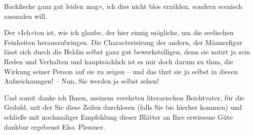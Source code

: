                Backfische ganz gut leiden mag«, ich dies nicht blos erzählen, sondern scenisch
               ausmalen will.\pend
           
\pstart
           Der »Ich«ton ist, wie ich glaube, der hier einzig mögliche, um die seelischen
               Feinheiten herauszubringen. Die Characterisirung der andern, der Männerfigur lässt
               sich durch die Heldin selbst ganz gut bewerkstelligen, denn sie notirt ja sein Reden
               und Verhalten und hauptsächlich ist es mir doch darum zu thun, die Wirkung {\pb}seiner Person auf sie zu zeigen – und das thut sie ja
               selbst in diesen Aufzeichnungen! – Nun, Sie werden ja selbst sehen!\pend
           
\pstart
           Und somit danke ich Ihnen, meinem verehrten literarischen Beichtvater, für die
               Geduld, mit der Sie diese Zeilen durchlesen (falls Sie bis hierher kommen) und
               schließe mit nochmaliger Empfehlung dieser Blätter an Ihre erwiesene Güte dankbar ergebenst\pend
           \pstart \spacefill\mbox{Elsa Plessner.}\pend{}\endnumbering{}  \newcommand{\dateiname}{L03700}\newcommand{\titel}{Elsa Plessner an Arthur Schnitzler, 14. 4. 1896}\newcommand{\editorInnen}{Selma Jahnke und Martin Anton Müller}
